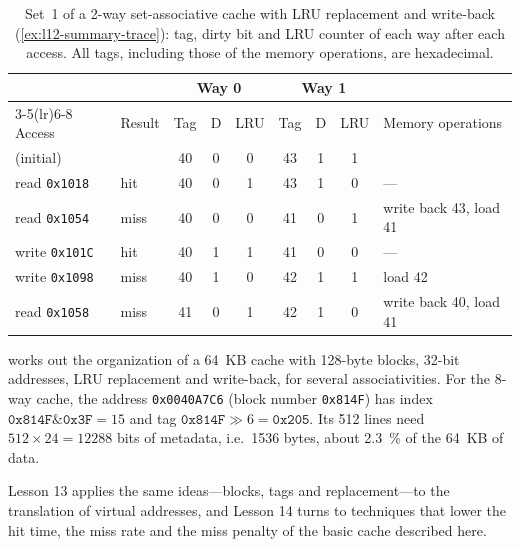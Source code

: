 \documentclass[../main.tex]{subfiles}
\begin{document}
\begin{table}[tb]
  \centering\small
  \caption{Set~1 of a 2-way set-associative cache with LRU replacement and
    write-back (\cref{ex:l12-summary-trace}): tag, dirty bit and LRU counter
    of each way after each access.  All tags, including those of the memory
    operations, are hexadecimal.}
  \label{tab:l12-summary-trace}
  \setlength{\tabcolsep}{4pt}
  \begin{tabular}{@{}llccccccl@{}}
    \toprule
    & & \multicolumn{3}{c}{Way 0} & \multicolumn{3}{c}{Way 1} & \\
    \cmidrule(lr){3-5}\cmidrule(lr){6-8}
    Access & Result & Tag & D & LRU & Tag & D & LRU & Memory operations \\
    \midrule
    (initial)             &      & 40 & 0 & 0 & 43 & 1 & 1 & \\
    read \texttt{0x1018}  & hit  & 40 & 0 & 1 & 43 & 1 & 0 & --- \\
    read \texttt{0x1054}  & miss & 40 & 0 & 0 & 41 & 0 & 1 & write back 43, load 41 \\
    write \texttt{0x101C} & hit  & 40 & 1 & 1 & 41 & 0 & 0 & --- \\
    write \texttt{0x1098} & miss & 40 & 1 & 0 & 42 & 1 & 1 & load 42 \\
    read \texttt{0x1058}  & miss & 41 & 0 & 1 & 42 & 1 & 0 & write back 40, load 41 \\
    \bottomrule
  \end{tabular}
\end{table}

\begin{example}
  \label{ex:l12-overhead}
   works out the organization of a
  64~KB cache with 128-byte blocks, 32-bit addresses,
  LRU replacement and write-back, for several associativities.  For the
  8-way cache, the address \texttt{0x0040A7C6} (block number
  \texttt{0x814F}) has index $\texttt{0x814F} \mathbin{\&} \texttt{0x3F} = 15$
  and tag $\texttt{0x814F} \gg 6 = \texttt{0x205}$.  Its 512 lines need
  $512 \times 24 = \num{12288}$ bits of metadata, i.e.\ 1536 bytes,
  about \SI{2.3}{\percent} of the 64~KB of data.
\end{example}

Lesson 13 applies the same ideas---blocks, tags and replacement---to the
translation of virtual addresses, and Lesson 14 turns to techniques that
lower the hit time, the miss rate and the miss penalty of the basic cache
described here.
\end{document}
